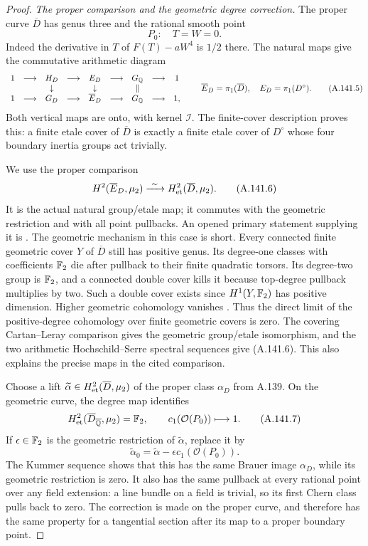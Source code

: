 \begin{proof}
\emph{The proper comparison and the geometric degree correction.}
The proper curve \(\overline D\) has genus three and the rational
smooth point
\[
                   P_0:\quad T=W=0.
\tag{A.141.4}
\]
Indeed the derivative in \(T\) of \(F(T)-aW^4\) is \(1/2\) there.
The natural maps give the commutative arithmetic diagram
\[
 \begin{array}{ccccccccc}
 1&\longrightarrow&H_D&\longrightarrow&E_D&\longrightarrow&G_\mathbb Q&\longrightarrow&1\\
 &&\downarrow&&\downarrow&&\Vert\\
 1&\longrightarrow&G_D&\longrightarrow&\overline E_D&\longrightarrow&G_\mathbb Q&\longrightarrow&1,
 \end{array}
 \qquad
 \overline E_D=\pi_1(\overline D),\quad E_D=\pi_1(D^\circ).
\tag{A.141.5}
\]
Both vertical maps are onto, with kernel \(\mathcal I\).
The finite-cover description proves this: a finite etale cover
of \(\overline D\) is exactly a finite etale cover of \(D^\circ\)
whose four boundary inertia groups act trivially.

We use the proper comparison
\[
 H^2(\overline E_D,\mu_2)
                  \xrightarrow{\ \sim\ }
 H^2_{\rm et}(\overline D,\mu_2).
\tag{A.141.6}
\]
It is the actual natural group/etale map; it commutes with the
geometric restriction and with all point pullbacks.
An opened primary statement supplying it is
\cite[Theorem 1.1, Lemma 3.3 and Theorem 3.7]{LegLevrat2024}.
The geometric mechanism in this case is short.
Every connected finite geometric cover \(Y\) of \(\overline D\)
still has positive genus.  Its degree-one classes with coefficients
\(\mathbb F_2\) die after pullback to their finite quadratic torsors.
Its degree-two group is \(\mathbb F_2\), and a connected double cover
kills it because top-degree pullback multiplies by two.
Such a double cover exists since \(H^1(Y,\mathbb F_2)\) has positive
dimension.  Higher geometric cohomology vanishes
\cite[Propositions 14.1 and 14.2]{AgentMilneLEC}.
Thus the direct limit of the positive-degree cohomology over
finite geometric covers is zero.  The covering
Cartan--Leray comparison gives the geometric group/etale
isomorphism, and the two arithmetic Hochschild--Serre spectral
sequences give (A.141.6).  This also explains the precise maps in
the cited comparison.

Choose a lift
\(\widetilde\alpha\in H^2_{\rm et}(\overline D,\mu_2)\)
of the proper class \(\alpha_D\) from A.139.
On the geometric curve, the degree map identifies
\[
 H^2_{\rm et}(\overline D_{\overline{\mathbb Q}},\mu_2)=\mathbb F_2,\qquad
                   c_1(\mathcal O(P_0))\longmapsto1.
\tag{A.141.7}
\]
If \(\epsilon\in\mathbb F_2\) is the geometric restriction of
\(\widetilde\alpha\), replace it by
\[
              \widetilde\alpha_0=
                  \widetilde\alpha-\epsilon c_1(\mathcal O(P_0)).
\tag{A.141.8}
\]
The Kummer sequence shows that this has the same Brauer image
\(\alpha_D\), while its geometric restriction is zero.
It also has the same pullback at every rational point over any
field extension: a line bundle on a field is trivial, so its
first Chern class pulls back to zero.
The correction is made on the proper curve, and therefore has
the same property for a tangential section after its map to a
proper boundary point.


\end{proof}
